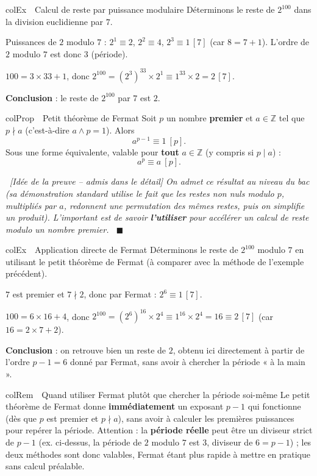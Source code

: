 \documentclass[11pt,a4paper]{article}
\newenvironment{propriete}[1][Propriété]
  {\begin{fiche}{colProp}{\ding{72}~~#1}}{\end{fiche}}
\newenvironment{exemple}[1][Exemple]
  {\begin{fiche}{colEx}{\ding{217}~~#1}}{\end{fiche}}
\newenvironment{remarque}[1][Remarque]
  {\begin{fiche}{colRem}{\ding{43}~~#1}}{\end{fiche}}
\newenvironment{demo}
  {\par\smallskip\noindent{\sffamily\bfseries\color{qtealdark}Démonstration.}\ \itshape}
  {\ \normalfont\hfill$\blacksquare$\par\medskip}
\begin{document}
\begin{exemple}[Calcul de reste par puissance modulaire]
Déterminons le reste de $2^{100}$ dans la division euclidienne par $7$.

\smallskip
Puissances de $2$ modulo $7$ : $2^1\equiv2$, $2^2\equiv4$, $2^3\equiv1\,[7]$ (car $8=7+1$). L'ordre de $2$ modulo $7$ est donc $3$ (période).

\smallskip
$100=3\times33+1$, donc $2^{100}=(2^3)^{33}\times2^1\equiv1^{33}\times2=2\,[7]$.

\smallskip
\textbf{Conclusion} : le reste de $2^{100}$ par $7$ est $2$.
\end{exemple}

\begin{propriete}[Petit théorème de Fermat]
Soit $p$ un nombre \textbf{premier} et $a\in\mathbb{Z}$ tel que $p\nmid a$ (c'est-à-dire $a\wedge p=1$). Alors
\[
  a^{p-1} \equiv 1 \ [p].
\]
Sous une forme équivalente, valable pour \textbf{tout} $a\in\mathbb{Z}$ (y compris si $p\mid a$) :
\[
  a^p \equiv a \ [p].
\]
\end{propriete}

\begin{demo}[Idée de la preuve -- admis dans le détail]
On admet ce résultat au niveau du bac (sa démonstration standard utilise le fait que les restes non nuls modulo $p$, multipliés par $a$, redonnent une permutation des mêmes restes, puis on simplifie un produit). L'important est de savoir \textbf{l'utiliser} pour accélérer un calcul de reste modulo un nombre premier.
\end{demo}

\begin{exemple}[Application directe de Fermat]
Déterminons le reste de $2^{100}$ modulo $7$ en utilisant le petit théorème de Fermat (à comparer avec la méthode de l'exemple précédent).

\smallskip
$7$ est premier et $7\nmid2$, donc par Fermat : $2^{6}\equiv1\,[7]$.

\smallskip
$100 = 6\times16+4$, donc $2^{100}=\left(2^6\right)^{16}\times2^4\equiv1^{16}\times2^4=16\equiv2\,[7]$ (car $16=2\times7+2$).

\smallskip
\textbf{Conclusion} : on retrouve bien un reste de $2$, obtenu ici directement à partir de l'ordre $p-1=6$ donné par Fermat, sans avoir à chercher la période « à la main ».
\end{exemple}

\begin{remarque}[Quand utiliser Fermat plutôt que chercher la période soi-même]
Le petit théorème de Fermat donne \textbf{immédiatement} un exposant $p-1$ qui fonctionne (dès que $p$ est premier et $p\nmid a$), sans avoir à calculer les premières puissances pour repérer la période. Attention : la \textbf{période réelle} peut être un diviseur strict de $p-1$ (ex. ci-dessus, la période de $2$ modulo $7$ est $3$, diviseur de $6=p-1$) ; les deux méthodes sont donc valables, Fermat étant plus rapide à mettre en pratique sans calcul préalable.
\end{remarque}
\end{document}
